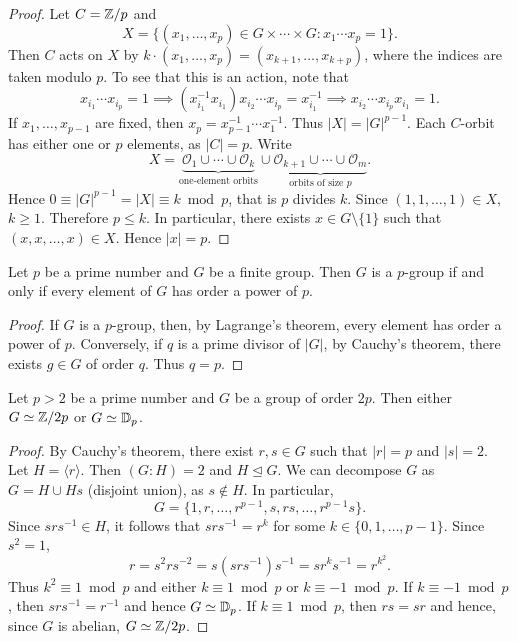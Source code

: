 \begin{proof}
Let $C=\mathbb{Z}/p$ and 
\[
X=\{(x_1,\dots,x_p)\in G\times\cdots\times G:x_1\cdots x_p=1\}.
\]
Then $C$ acts on $X$ by $k\cdot (x_1,\dots,x_p)=(x_{k+1},\dots,x_{k+p})$, where the indices are taken modulo $p$. To see that
this is an action, note that 
\[
x_{i_1}\cdots x_{i_p}=1
\implies (x_{i_1}^{-1}x_{i_1})x_{i_2}\cdots x_{i_p}=x_{i_1}^{-1}
\implies x_{i_2}\cdots x_{i_p}x_{i_1}=1.
\]
If $x_1,\dots,x_{p-1}$ are fixed, then 
$x_p=x_{p-1}^{-1}\cdots x_{1}^{-1}$. Thus $|X|=|G|^{p-1}$. Each $C$-orbit
has either one or $p$ elements, as $|C|=p$. Write
\[
X=\underbrace{\mathcal{O}_1\cup\cdots\cup \mathcal{O}_k}_{\text{one-element orbits}}\cup\underbrace{\mathcal{O}_{k+1}\cup\cdots\cup\mathcal{O}_m}_{\text{orbits of size $p$}}.
\]
Hence $0\equiv |G|^{p-1}=|X|\equiv k\bmod p$, that is $p$ divides $k$. Since $(1,1,\dots,1)\in X$, $k\geq 1$. Therefore $p\leq k$. In particular,
there exists $x\in G\setminus\{1\}$ such that $(x,x,\dots,x)\in X$. Hence $|x|=p$.
\end{proof}

\begin{corollary}
    Let $p$ be a prime number and $G$ be a finite group. 
    Then $G$ is a $p$-group if and only if 
    every element of $G$ has order a power of $p$. 
\end{corollary}

\begin{proof}
    If $G$ is a $p$-group, then, by Lagrange's theorem, 
    every element has order a power of $p$. Conversely, 
    if $q$ is a prime divisor of $|G|$, by 
    Cauchy's theorem, there exists $g\in G$ of order $q$. Thus $q=p$.
\end{proof}

\begin{corollary}
    Let $p>2$ be a prime number 
    and $G$ be a group of order $2p$. 
    Then either $G\simeq\mathbb{Z}/2p$ or $G\simeq\mathbb{D}_p$.
\end{corollary}

\begin{proof}
    By Cauchy's theorem, there exist $r,s\in G$ such that
    $|r|=p$ and $|s|=2$. Let $H=\langle r\rangle$. Then
    $(G:H)=2$ and $H\unlhd G$. We can decompose $G$ as 
    $G=H\cup Hs$ (disjoint union), 
    as $s\not\in H$. In particular, 
\[
G=\{1,r,\dots,r^{p-1},s,rs,\dots,r^{p-1}s\}.
\]
Since $srs^{-1}\in H$, it follows that $srs^{-1}=r^k$ for some
$k\in\{0,1,\dots,p-1\}$. Since $s^2=1$,
\[
r=s^2rs^{-2}=s(srs^{-1})s^{-1}=sr^ks^{-1}=r^{k^2}.
\]
Thus $k^2\equiv 1\bmod p$ and either 
$k\equiv 1\bmod p$ or $k\equiv-1\bmod p$. 
If $k\equiv -1\bmod p$, then $srs^{-1}=r^{-1}$ and hence $G\simeq\mathbb{D}_p$.
If $k\equiv 1\bmod p$, then $rs=sr$ and hence, since $G$ is abelian, $G\simeq\mathbb{Z}/{2p}$.
\end{proof}


